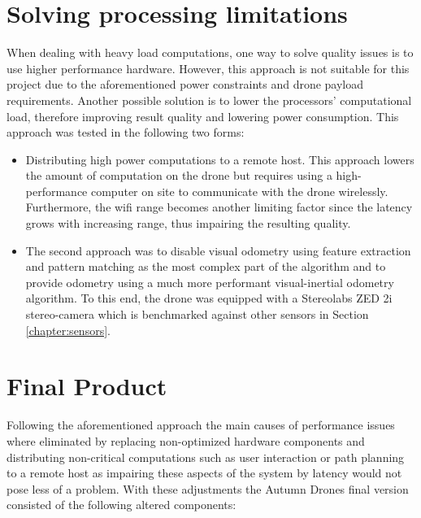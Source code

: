 \section{Solving processing limitations}
When dealing with heavy load computations, one way to solve quality issues is to use higher performance hardware. However, this approach is not suitable for this project due to the aforementioned power constraints and drone payload requirements. 
Another possible solution is to lower the processors' computational load, therefore improving result quality and lowering power consumption. 
This approach was tested in the following two forms:
\begin{itemize}
	
	\item Distributing high power computations to a remote host. This approach lowers the amount of computation on the drone but requires using a high-performance computer on site to communicate with the drone wirelessly. Furthermore, the wifi range becomes another limiting factor since the latency grows with increasing range, thus impairing the resulting quality.
	
	\item The second approach was to disable visual odometry using feature extraction and pattern matching as the most complex part of the algorithm and to provide odometry using a much more performant visual-inertial odometry algorithm. To this end, the drone was equipped with a Stereolabs ZED 2i stereo-camera which is benchmarked against other sensors in Section \ref{chapter:sensors}.%
\end{itemize}

\section{Final Product}\label{sec:finalProduct}
Following the aforementioned approach the main causes of performance issues where eliminated by replacing non-optimized hardware components and distributing non-critical computations such as user interaction or path planning to a remote host as impairing these aspects of the system by latency would not pose less of a problem. 
With these adjustments the Autumn Drones final version consisted of the following altered components:

